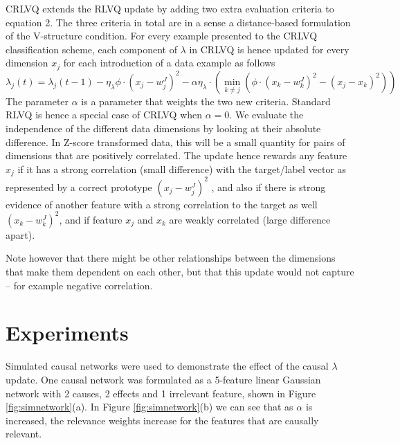 \documentclass{esannV2}
\begin{document}
CRLVQ extends the RLVQ update by adding two extra evaluation criteria to equation 2. The three criteria in total are in a sense a distance-based formulation of the V-structure condition. For every example presented to the CRLVQ classification scheme, each component of $\lambda$ in CRLVQ is hence updated for every dimension $x_j$ for each introduction of a data example as follows
%
\begin{equation} 
\lambda_j(t) = \lambda_j(t-1) - \eta_\lambda \phi \cdot (x_j - w_j^J)^2 - \alpha \eta_\lambda \cdot \left( \min_{k \neq j}\left(\phi \cdot (x_k - w_k^J)^2 - (x_j - x_k)^2 \right) \right)
\end{equation}
%
The parameter $\alpha$ is a parameter that weights the two new criteria. Standard RLVQ is hence a special case of CRLVQ when $\alpha = 0$. We evaluate the independence of the different data dimensions by looking at their absolute difference. In Z-score transformed data, this will be a small quantity for pairs of dimensions that are positively correlated. The update hence rewards any feature $x_j$ if it has a strong correlation (small difference) with the target/label vector as represented by a correct prototype $(x_j - w_j^J)^2$ , and also if there is strong evidence of another feature with a strong correlation to the target as well $(x_k - w_k^J)^2$, and if feature $x_j$ and $x_k$ are weakly correlated (large difference apart).

Note however that there might be other relationships between the dimensions that make them dependent on each other, but that this update would not capture -- for example negative correlation. 

\section{Experiments}
\label{sec:Experiments}

Simulated causal networks were used to demonstrate the effect of the causal $\lambda$ update. One causal network was formulated as a 5-feature linear Gaussian network with 2 causes, 2 effects and 1 irrelevant feature, shown in Figure \ref{fig:simnetwork}(a). In Figure \ref{fig:simnetwork}(b) we can see that as $\alpha$ is increased, the relevance weights increase for the features that are causally relevant. 
\end{document}
